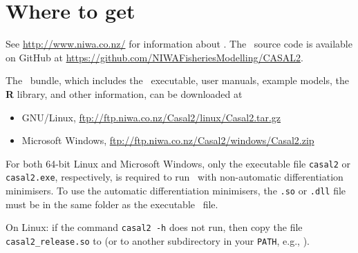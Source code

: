 \section{Where to get \CNAME}\label{sec:installing}

See \url{http://www.niwa.co.nz/} for information about \CNAME . The \CNAME\ source code is available on GitHub at \url{https://github.com/NIWAFisheriesModelling/CASAL2}.

The \CNAME\ bundle, which includes the \CNAME\ executable, user manuals, example models, the \textbf{R} library, and other information, can be downloaded at

\begin{itemize}
	\item GNU/Linux, \url{ftp://ftp.niwa.co.nz/Casal2/linux/Casal2.tar.gz}
	\item Microsoft Windows, \url{ftp://ftp.niwa.co.nz/Casal2/windows/Casal2.zip}
\end{itemize}

For both 64-bit Linux and Microsoft Windows, only the executable file \texttt{casal2} or \texttt{casal2.exe}, respectively, is required to run \CNAME\ with non-automatic differentiation minimisers. To use the automatic differentiation minimisers, the \texttt{.so} or \texttt{.dll} file must be in the same folder as the executable \CNAME\ file.

On Linux:  if the command \texttt{casal2 -h} does not run, then copy the file \texttt{casal2\_release.so} to  (or to another subdirectory in your \texttt{PATH}, e.g., ).


